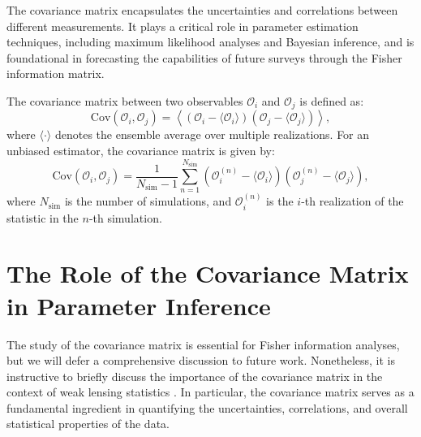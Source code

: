 The covariance matrix encapsulates the uncertainties and correlations between different measurements. It plays a critical role in parameter estimation techniques, including maximum likelihood analyses and Bayesian inference, and is foundational in forecasting the capabilities of future surveys through the Fisher information matrix.

The covariance matrix between two observables $\mathcal{O}_i$ and $\mathcal{O}_j$ is defined as:
\begin{equation}
    \mathrm{Cov}(\mathcal{O}_i, \mathcal{O}_j) = \left\langle (\mathcal{O}_i - \langle \mathcal{O}_i \rangle)(\mathcal{O}_j - \langle \mathcal{O}_j \rangle) \right\rangle,
\end{equation}
where $\langle \cdot \rangle$ denotes the ensemble average over multiple realizations.
For an unbiased estimator, the covariance matrix is given by:
\begin{equation}
    \label{eq:covariance}
    \mathrm{Cov}(\mathcal{O}_i, \mathcal{O}_j) = \frac{1}{N_{\mathrm{sim}} - 1} \sum_{n=1}^{N_{\mathrm{sim}}} (\mathcal{O}_i^{(n)} - \langle \mathcal{O}_i \rangle) (\mathcal{O}_j^{(n)} - \langle \mathcal{O}_j \rangle),
\end{equation}
where \( N_{\mathrm{sim}} \) is the number of simulations, and \( \mathcal{O}_i^{(n)} \) is the \( i \)-th realization of the statistic in the \( n \)-th simulation.

\section{The Role of the Covariance Matrix in Parameter Inference}
The study of the covariance matrix is essential for Fisher information analyses, but we will defer a comprehensive discussion to future work. Nonetheless, it is instructive to briefly discuss the importance of the covariance matrix in the context of weak lensing statistics \citep{2004MNRAS.348..897T, 2005A&A...442...69K}. In particular, the covariance matrix serves as a fundamental ingredient in quantifying the uncertainties, correlations, and overall statistical properties of the data.

